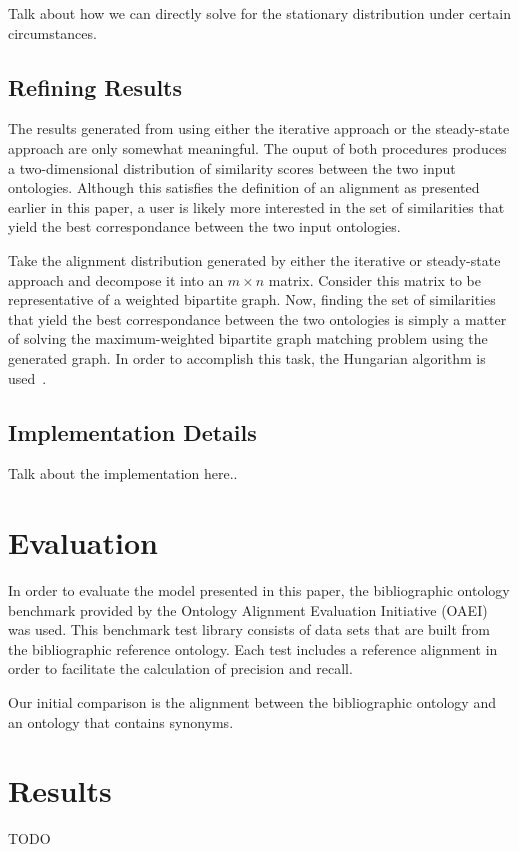 \documentclass[letterpaper,twocolumn,12pt]{article}
\begin{document}
Talk about how we can directly solve for the stationary distribution under certain circumstances.

\subsection{Refining Results}

The results generated from using either the iterative approach or the steady-state approach are only somewhat meaningful.
The ouput of both procedures produces a two-dimensional distribution of similarity scores between the two input ontologies.
Although this satisfies the definition of an alignment as presented earlier in this paper, a user is likely more interested in the set of similarities that yield the best correspondance between the two input ontologies.

Take the alignment distribution generated by either the iterative or steady-state approach and decompose it into an $m \times n$ matrix.
Consider this matrix to be representative of a weighted bipartite graph.
Now, finding the set of similarities that yield the best correspondance between the two ontologies is simply a matter of solving the maximum-weighted bipartite graph matching problem using the generated graph.
In order to accomplish this task, the Hungarian algorithm is used~\cite{kuhn:1955:hungarian}.

\subsection{Implementation Details}

Talk about the implementation here..

\section{Evaluation}

In order to evaluate the model presented in this paper, the bibliographic ontology benchmark provided by the Ontology Alignment Evaluation Initiative (OAEI) was used.
This benchmark test library consists of data sets that are built from the bibliographic reference ontology.
Each test includes a reference alignment in order to facilitate the calculation of precision and recall.

Our initial comparison is the alignment between the bibliographic ontology and an ontology that contains synonyms.

\section{Results}
TODO
\end{document}
